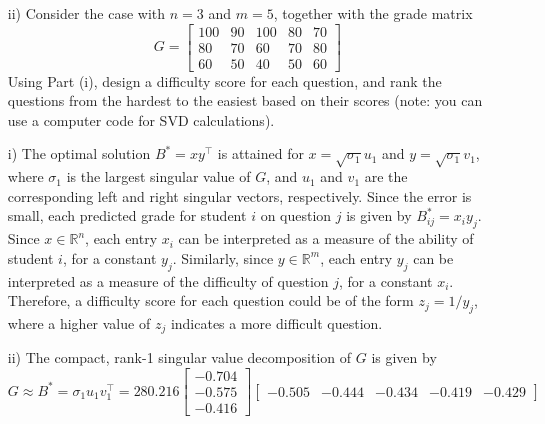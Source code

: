 \begin{homeworkProblem}
\begin{itemize}
        \item [ii)] Consider the case with $n=3$ and $m=5$, together with the 
        grade matrix
        \begin{equation}
            G=\left[\begin{array}{ccccc} 100 & 90 & 100 & 80 & 70 \\ 
            80 & 70& 60& 70& 80\\ 60& 50& 40& 50 & 60 \end{array}\right]
        \end{equation}
        Using Part (i), design a difficulty score for each question, and rank 
        the questions from the hardest to the easiest based on their scores 
        (note: you can use a computer code for SVD calculations). 

    \end{itemize}

    \begin{solution}
        \begin{itemize}
            \item[i)] The optimal solution $B^* = xy^\top$ is attained for $x =
                \sqrt{\sigma_1} u_1$ and $y = \sqrt{\sigma_1} v_1$, where 
                $\sigma_1$ is the largest singular value of $G$, and $u_1$ and 
                $v_1$ are the corresponding left and right singular vectors, 
                respectively. Since the error is small, each predicted grade 
                for student $i$ on question $j$ is given by $B^*_{ij} = 
                x_i y_j$. Since $x \in \mathbb{R}^n$, each entry $x_i$ can be 
                interpreted as a measure of the ability of student $i$, for a
                constant $y_j$. Similarly, since $y \in \mathbb{R}^m$, each
                entry $y_j$ can be interpreted as a measure of the difficulty
                of question $j$, for a constant $x_i$. Therefore, a difficulty
                score for each question could be of the form $z_j = 1/y_j$,
                where a higher value of $z_j$ indicates a more difficult
                question.

            \item[ii)] The compact, rank-1 singular value decomposition of $G$
                is given by
                \[
                    G \approx B^* = \sigma_1 u_1 v_1^\top = 280.216
                    \begin{bmatrix}
                        -0.704 \\ -0.575 \\ -0.416
                    \end{bmatrix}
                    \begin{bmatrix}
                        -0.505 & -0.444 & -0.434 & -0.419 & -0.429
                    \end{bmatrix}
                \]


\end{itemize}
\end{solution}
\end{homeworkProblem}
